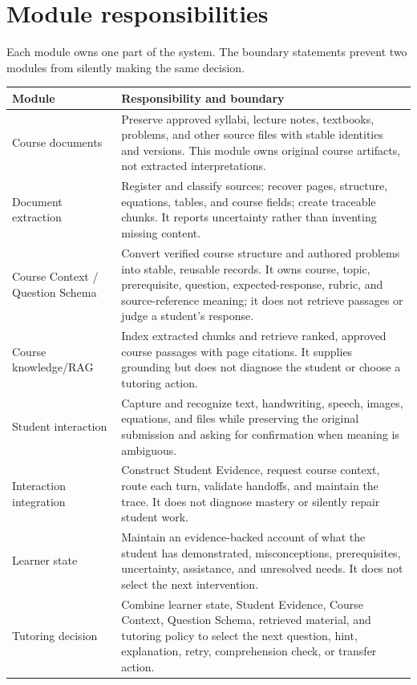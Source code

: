\documentclass[11pt]{article}
\begin{document}
\section{Module responsibilities}

Each module owns one part of the system. The boundary statements prevent two modules from silently making the same decision.

\noindent\begin{tabularx}{\textwidth}{@{}p{}X@{}}
\toprule
\textbf{Module} & \textbf{Responsibility and boundary} \\
\midrule
Course documents & Preserve approved syllabi, lecture notes, textbooks, problems, and other source files with stable identities and versions. This module owns original course artifacts, not extracted interpretations. \\
Document extraction & Register and classify sources; recover pages, structure, equations, tables, and course fields; create traceable chunks. It reports uncertainty rather than inventing missing content. \\
Course Context / Question Schema & Convert verified course structure and authored problems into stable, reusable records. It owns course, topic, prerequisite, question, expected-response, rubric, and source-reference meaning; it does not retrieve passages or judge a student's response. \\
Course knowledge/RAG & Index extracted chunks and retrieve ranked, approved course passages with page citations. It supplies grounding but does not diagnose the student or choose a tutoring action. \\
Student interaction & Capture and recognize text, handwriting, speech, images, equations, and files while preserving the original submission and asking for confirmation when meaning is ambiguous. \\
Interaction integration & Construct Student Evidence, request course context, route each turn, validate handoffs, and maintain the trace. It does not diagnose mastery or silently repair student work. \\
Learner state & Maintain an evidence-backed account of what the student has demonstrated, misconceptions, prerequisites, uncertainty, assistance, and unresolved needs. It does not select the next intervention. \\
Tutoring decision & Combine learner state, Student Evidence, Course Context, Question Schema, retrieved material, and tutoring policy to select the next question, hint, explanation, retry, comprehension check, or transfer action. \\

\end{tabularx}
\end{document}
